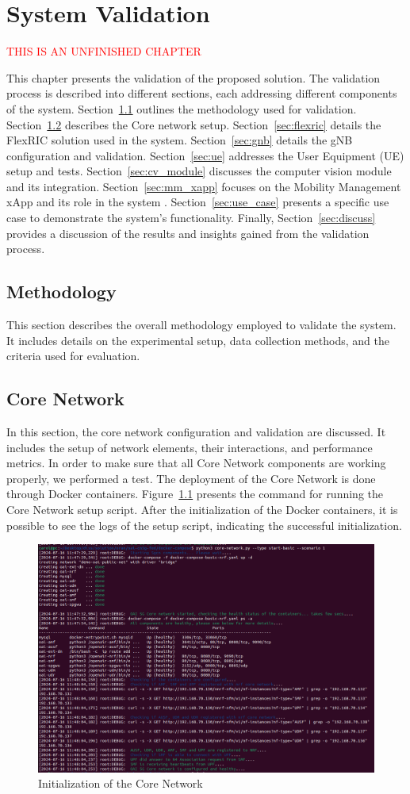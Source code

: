 \chapter{System Validation}\label{ch:validation}

\textcolor{red}{THIS IS AN UNFINISHED CHAPTER}

This chapter presents the validation of the proposed solution.
The validation process is described into different sections, each addressing different components of the system.
Section~\ref{sec:meth} outlines the methodology used for validation.
Section~\ref{sec:core_network} describes the Core network setup.
Section~\ref{sec:flexric} details the FlexRIC solution used in the system.
Section~\ref{sec:gnb} details the gNB configuration and validation.
Section~\ref{sec:ue} addresses the User Equipment (UE) setup and tests.
Section~\ref{sec:cv_module} discusses the computer vision module and its integration.
Section~\ref{sec:mm_xapp} focuses on the Mobility Management xApp and its role in the system .
Section~\ref{sec:use_case} presents a specific use case to demonstrate the system's functionality.
Finally, Section~\ref{sec:discuss} provides a discussion of the results and insights gained from the validation process.

\section{Methodology}\label{sec:meth}
This section describes the overall methodology employed to validate the system.
It includes details on the experimental setup, data collection methods, and the criteria used for evaluation.

\section{Core Network}\label{sec:core_network}
In this section, the core network configuration and validation are discussed.
It includes the setup of network elements, their interactions, and performance metrics.
In order to make sure that all Core Network components are working properly, we performed a test.
The deployment of the Core Network is done through Docker containers.
Figure~\ref{fig:core_init} presents the command for running the Core Network setup script.
After the initialization of the Docker containers, it is possible to see the logs of the setup script, indicating the successful initialization.

\begin{figure}[H]
    \centering
    \includegraphics[width=0.5\linewidth]{figures/core_init}
    \caption[Initialization of the Core Network]{Initialization of the Core Network}
    \label{fig:core_init}
\end{figure}

